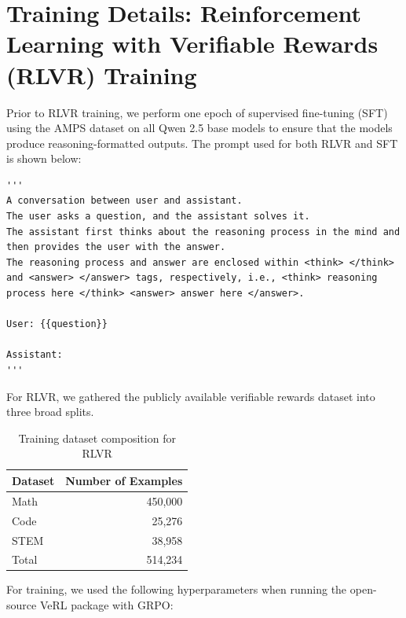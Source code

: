 \documentclass{article}
\begin{document}
{\section{Training Details: Reinforcement Learning with Verifiable Rewards (RLVR) Training }
\label{app:rlvr_training_details}
Prior to RLVR training, we perform one epoch of supervised fine-tuning (SFT) using the AMPS dataset \cite{math500} on all Qwen 2.5 base models \cite{model:Qwen25} to ensure that the models produce reasoning-formatted outputs. The prompt used for both RLVR and SFT is shown below:

\begin{Verbatim}[breaklines=true]
'''
A conversation between user and assistant. 
The user asks a question, and the assistant solves it. 
The assistant first thinks about the reasoning process in the mind and then provides the user with the answer. 
The reasoning process and answer are enclosed within <think> </think> and <answer> </answer> tags, respectively, i.e., <think> reasoning process here </think> <answer> answer here </answer>. 

User: {{question}}

Assistant: 
'''
\end{Verbatim}

For RLVR, we gathered the publicly available verifiable rewards dataset into three broad splits. 
\begin{table}[H]
\caption{Training dataset composition for RLVR}
\centering
\begin{tabular}{l r}
\toprule
\textbf{Dataset} & \textbf{Number of Examples} \\
\midrule
Math   & 450,000 \\
Code   &  25,276 \\
STEM   &  38,958 \\
\midrule
Total  & 514,234 \\
\bottomrule
\end{tabular}
\vspace{0.3em}
\label{table:rlvr-dataset-stats}
\end{table}

For training, we used the following hyperparameters when running the open-source VeRL \cite{verl} package with GRPO:

}
\end{document}
